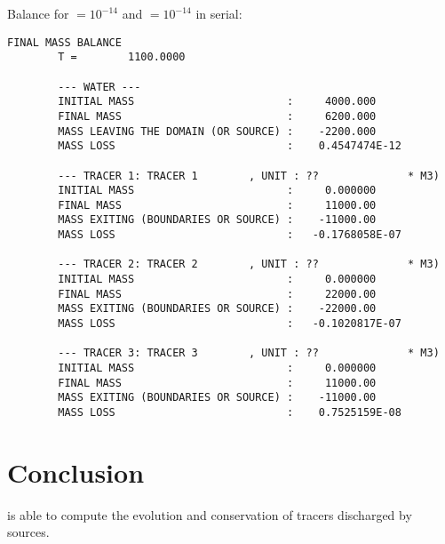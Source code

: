 Balance for  $= 10^{-14}$ and
 $= 10^{-14}$ in serial:
%
\begin{lstlisting}[language=TelFortran]
                        FINAL MASS BALANCE
        T =        1100.0000

        --- WATER ---
        INITIAL MASS                        :     4000.000
        FINAL MASS                          :     6200.000
        MASS LEAVING THE DOMAIN (OR SOURCE) :    -2200.000
        MASS LOSS                           :    0.4547474E-12

        --- TRACER 1: TRACER 1        , UNIT : ??              * M3)
        INITIAL MASS                        :     0.000000
        FINAL MASS                          :     11000.00
        MASS EXITING (BOUNDARIES OR SOURCE) :    -11000.00
        MASS LOSS                           :   -0.1768058E-07

        --- TRACER 2: TRACER 2        , UNIT : ??              * M3)
        INITIAL MASS                        :     0.000000
        FINAL MASS                          :     22000.00
        MASS EXITING (BOUNDARIES OR SOURCE) :    -22000.00
        MASS LOSS                           :   -0.1020817E-07

        --- TRACER 3: TRACER 3        , UNIT : ??              * M3)
        INITIAL MASS                        :     0.000000
        FINAL MASS                          :     11000.00
        MASS EXITING (BOUNDARIES OR SOURCE) :    -11000.00
        MASS LOSS                           :    0.7525159E-08
\end{lstlisting}
%
\section{Conclusion}
%
 is able to compute the evolution and conservation of
tracers discharged by sources.
%
%
